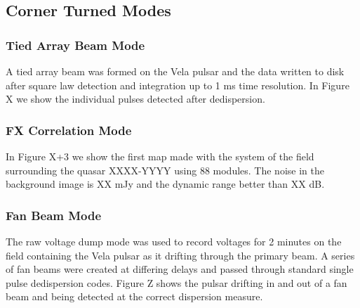 \subsection{Corner Turned Modes}
\subsubsection{Tied Array Beam Mode}

A tied array beam was formed on the Vela pulsar and the data written to disk after square law detection and integration up to 1 ms time resolution. In Figure X we show the individual pulses detected after dedispersion. 

\subsubsection{FX Correlation Mode}

In Figure X+3 we show the first map made with the system of the field surrounding the quasar XXXX-YYYY using 88 modules. The noise in the background image is XX mJy and the dynamic range better than XX dB.

\subsubsection{Fan Beam Mode}

The raw voltage dump mode was used to record voltages for 2 minutes on the field containing the Vela pulsar as it drifting through the primary beam. A series of fan beams were created at differing delays and passed through standard single pulse dedispersion codes. Figure Z shows the pulsar drifting in and out of a fan beam and being detected at the correct dispersion measure.

